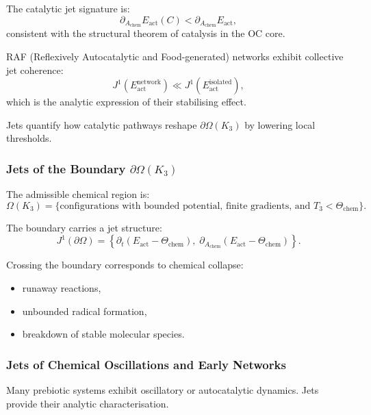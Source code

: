 The catalytic jet signature is:
\[
\partial_{A_{\mathrm{chem}}}E_{\mathrm{act}}(C)
<
\partial_{A_{\mathrm{chem}}}E_{\mathrm{act}},
\]
consistent with the structural theorem of catalysis in the OC core.

RAF (Reflexively Autocatalytic and Food-generated) networks exhibit
collective jet coherence:
\[
J^1(E_{\mathrm{act}}^{\mathrm{network}})
\ll
J^1(E_{\mathrm{act}}^{\mathrm{isolated}}),
\]
which is the analytic expression of their stabilising effect.

Jets quantify how catalytic pathways reshape $\partial\Omega(K_3)$ by
lowering local thresholds.



\subsubsection{Jets of the Boundary \texorpdfstring{\texorpdfstring{$\partial\Omega(K_3)$}{\partial\Omega(K_3)}}{Boundary}}

The admissible chemical region is:
\[
\Omega(K_3)=
\{
\text{configurations with bounded potential, finite gradients, and }
T_3 < \Theta_{\mathrm{chem}}
\}.
\]

The boundary carries a jet structure:
\[
J^1(\partial\Omega)=
\left\{
\partial_t(E_{\mathrm{act}}-\Theta_{\mathrm{chem}}),\;
\partial_{A_{\mathrm{chem}}}(E_{\mathrm{act}}-\Theta_{\mathrm{chem}})
\right\}.
\]

Crossing the boundary corresponds to chemical collapse:

\begin{itemize}
    \item runaway reactions,
    \item unbounded radical formation,
    \item breakdown of stable molecular species.
\end{itemize}



\subsubsection{Jets of Chemical Oscillations and Early Networks}

Many prebiotic systems exhibit oscillatory or autocatalytic dynamics.
Jets provide their analytic characterisation.

